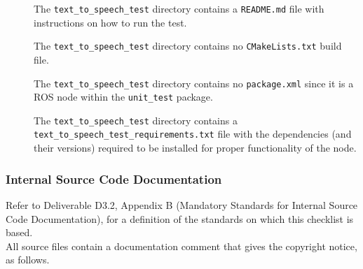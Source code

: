 \documentclass{CSSRforAfrica}
\newcommand{\checkboxChecked}{\fbox{\ding{51}}} %
\newcommand{\checkboxDashed}{\fbox{--}}         %
\begin{document}
\begin{description}
\item[\checkboxChecked] The {\small \verb+text_to_speech_test+} directory contains  a {\small \verb+README.md+} file with  instructions on how to run the test.

\item[\checkboxChecked] The {\small \verb+text_to_speech_test+} directory contains no {\small \verb+CMakeLists.txt+} build file.

\item[\checkboxChecked] The {\small \verb+text_to_speech_test+} directory contains no {\small \verb+package.xml+} since it is a ROS node within the {\small \verb+unit_test+} package.

\item[\checkboxDashed] The {\small \verb+text_to_speech_test+} directory contains a {{\small \texttt{text\_to\_speech\_test\_requirements.txt}}} file with  the dependencies (and their versions) required to be installed for proper functionality of the node.

\end{description}

\subsubsection{Internal Source Code Documentation}

Refer to Deliverable D3.2, Appendix B (Mandatory Standards for Internal Source Code Documentation), for a definition of the standards on which this checklist is based.\\

\noindent All source files contain a documentation comment that gives the copyright notice, as follows.
\end{document}
